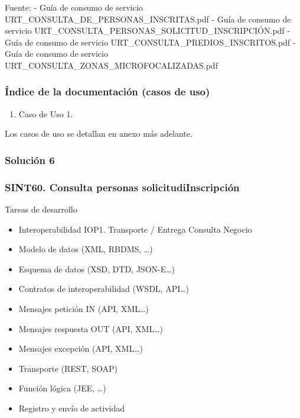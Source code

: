 \documentclass[
  paper=a4,
  ,captions=tableheading
]{scrartcl}
\providecommand{\tightlist}{%
  \setlength{\itemsep}{0pt}\setlength{\parskip}{0pt}}
\begin{document}
Fuente: - Guía de consumo de servicio
URT\_CONSULTA\_DE\_PERSONAS\_INSCRITAS.pdf - Guía de consumo de servicio
URT\_CONSULTA\_PERSONAS\_SOLICITUD\_INSCRIPCIÓN.pdf - Guía de consumo de
servicio URT\_CONSULTA\_PREDIOS\_INSCRITOS.pdf - Guía de consumo de
servicio URT\_CONSULTA\_ZONAS\_MICROFOCALIZADAS.pdf

\subsubsection{Índice de la documentación (casos de
uso)}\label{sec:uxedndice-de-la-documentaciuxf3n-casos-de-uso-2}

\begin{enumerate}
\def\labelenumi{\arabic{enumi}.}
\tightlist
\item
  Caso de Uso 1.
\end{enumerate}

Los casos de uso se detallan en anexo más adelante.

\subsubsection{Solución 6}\label{sec:soluciuxf3n-6}

\subsubsection{SINT60. Consulta personas
solicitudiInscripción}\label{sec:sint60.-consulta-personas-solicitudiinscripciuxf3n}

Tareas de desarrollo

\begin{itemize}
\tightlist
\item
  Interoperabilidad IOP1. Transporte / Entrega Consulta Negocio\\
\item
  Modelo de datos (XML, RBDMS, \ldots)
\item
  Esquema de datos (XSD, DTD, JSON-E\ldots)
\item
  Contratos de interoperabilidad (WSDL, API\ldots)
\item
  Mensajes petición IN (API, XML\ldots)
\item
  Mensajes respuesta OUT (API, XML\ldots)
\item
  Mensajes excepción (API, XML\ldots)
\item
  Transporte (REST, SOAP)
\item
  Función lógica (JEE, \ldots)
\item
  Registro y envío de actividad
\end{itemize}
\end{document}
